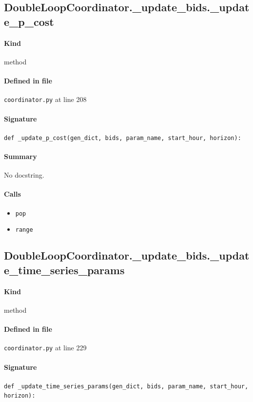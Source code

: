 \documentclass[11pt]{report}
\begin{document}
\subsection{DoubleLoopCoordinator.\_update\_bids.\_update\_p\_cost}
\label{def:coordinator.py:DoubleLoopCoordinator._update_bids._update_p_cost:L208}
\paragraph{Kind} method
\paragraph{Defined in file} \texttt{coordinator.py} at line 208
\paragraph{Signature} \texttt{def \_update\_p\_cost(gen\_dict, bids, param\_name, start\_hour, horizon):}
\paragraph{Summary} No docstring.
\paragraph{Calls}
\begin{itemize}[leftmargin=*]
  \item \texttt{pop}
  \item \texttt{range}
\end{itemize}
\subsection{DoubleLoopCoordinator.\_update\_bids.\_update\_time\_series\_params}
\label{def:coordinator.py:DoubleLoopCoordinator._update_bids._update_time_series_params:L229}
\paragraph{Kind} method
\paragraph{Defined in file} \texttt{coordinator.py} at line 229
\paragraph{Signature} \texttt{def \_update\_time\_series\_params(gen\_dict, bids, param\_name, start\_hour, horizon):}
\end{document}
